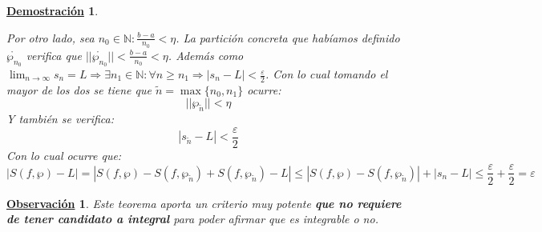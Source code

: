 \documentclass[10pt,a4paper,openright]{book}
\theoremstyle{break}
\newtheorem*{demo}{\underline{Demostración}}
\newtheorem{obs}{\underline{Observación}}[chapter]
\begin{document}
\begin{demo}
\begin{itemize}
Por otro lado, sea $n_0\in \mathbb N: \frac{b-a}{n_0}<\eta$. La partición concreta que habíamos definido $\mathring{\wp_{n_0}}$ verifica que $||\mathring{\wp_{n_0}}||<\frac{b-a}{n_0}<\eta$. Además como $\lim_{n\rightarrow \infty} s_n = L\Rightarrow \exists n_1\in \mathbb N: \forall n \geq n_1 \Rightarrow  |s_n-L|<\frac{\varepsilon}{2}$. Con lo cual tomando el mayor de los dos se tiene que $\tilde{n}=\max\{n_0,n_1\}$ ocurre:
$$||\wp_{\tilde{n}}||<\eta$$
Y también se verifica:
$$|s_{\tilde{n}}-L|<\frac{\varepsilon}{2}$$
Con lo cual ocurre que:
$$|S(f,\wp)-L|=|S(f,\wp)-S(f,\wp_{\tilde{n}})+S(f, \wp_{\tilde{n}})-L|\leq |S(f,\wp )- S(f,\wp_{\tilde{n}})|+|s_n-L|\leq \frac{\varepsilon}{2} + \frac{\varepsilon}{2} = \varepsilon$$
\end{itemize}
\end{demo}

\begin{obs}
Este teorema aporta un criterio muy potente \textbf{que no requiere de tener candidato a integral} para poder afirmar que es integrable o no.
\end{obs}
\end{document}
